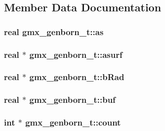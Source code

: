 \subsection{\-Member \-Data \-Documentation}
\hypertarget{structgmx__genborn__t_a4bdf488d6b1a78ae74f16fc57d8bea5f}{
\subsubsection[{as}]{\setlength{\rightskip}{0pt plus 5cm}real {\bf gmx\-\_\-genborn\-\_\-t\-::as}}}\label{structgmx__genborn__t_a4bdf488d6b1a78ae74f16fc57d8bea5f}
\hypertarget{structgmx__genborn__t_a9fdfe1c2743b615944245c62393901d9}{
\subsubsection[{asurf}]{\setlength{\rightskip}{0pt plus 5cm}real $\ast$ {\bf gmx\-\_\-genborn\-\_\-t\-::asurf}}}\label{structgmx__genborn__t_a9fdfe1c2743b615944245c62393901d9}
\hypertarget{structgmx__genborn__t_a0bef143f83d5a52feef518e94dc3e1a7}{
\subsubsection[{b\-Rad}]{\setlength{\rightskip}{0pt plus 5cm}real $\ast$ {\bf gmx\-\_\-genborn\-\_\-t\-::b\-Rad}}}\label{structgmx__genborn__t_a0bef143f83d5a52feef518e94dc3e1a7}
\hypertarget{structgmx__genborn__t_a40f0eb7eb7ef91031558f5ae48e875fd}{
\subsubsection[{buf}]{\setlength{\rightskip}{0pt plus 5cm}real $\ast$ {\bf gmx\-\_\-genborn\-\_\-t\-::buf}}}\label{structgmx__genborn__t_a40f0eb7eb7ef91031558f5ae48e875fd}
\hypertarget{structgmx__genborn__t_ab09f3ef1739ec7b725bb184422ceee10}{
\subsubsection[{count}]{\setlength{\rightskip}{0pt plus 5cm}int $\ast$ {\bf gmx\-\_\-genborn\-\_\-t\-::count}}}\label{structgmx__genborn__t_ab09f3ef1739ec7b725bb184422ceee10}
